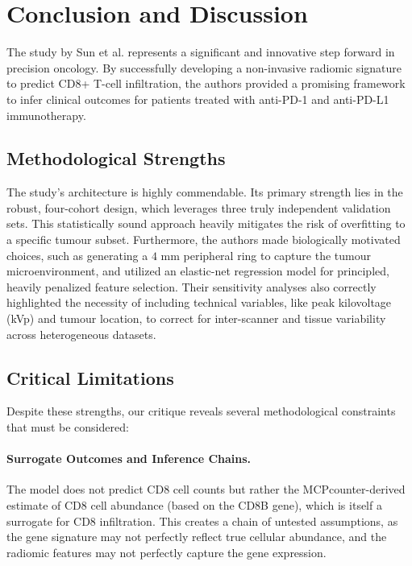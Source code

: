 \documentclass[10pt]{article}
\begin{document}
\section{Conclusion and Discussion}
The study by Sun et al. \cite{main} represents a significant and innovative step forward in precision oncology. By successfully developing a non-invasive radiomic signature to predict CD8+ T-cell infiltration, the authors provided a promising framework to infer clinical outcomes for patients treated with anti-PD-1 and anti-PD-L1 immunotherapy.

\subsection{Methodological Strengths}
The study's architecture is highly commendable. Its primary strength lies in the robust, four-cohort design, which leverages three truly independent validation sets. This statistically sound approach heavily mitigates the risk of overfitting to a specific tumour subset. Furthermore, the authors made biologically motivated choices, such as generating a $4$ mm peripheral ring to capture the tumour microenvironment, and utilized an elastic-net regression model for principled, heavily penalized feature selection. Their sensitivity analyses also correctly highlighted the necessity of including technical variables, like peak kilovoltage (kVp) and tumour location, to correct for inter-scanner and tissue variability across heterogeneous datasets.

\subsection{Critical Limitations}
Despite these strengths, our critique reveals several methodological constraints that must be considered:
\paragraph{Surrogate Outcomes and Inference Chains.} The model does not predict CD8 cell counts but rather the MCPcounter-derived estimate of CD8 cell abundance (based on the CD8B gene), which is itself a surrogate for CD8 infiltration. This creates a chain of untested assumptions, as the gene signature may not perfectly reflect true cellular abundance, and the radiomic features may not perfectly capture the gene expression.
\end{document}
